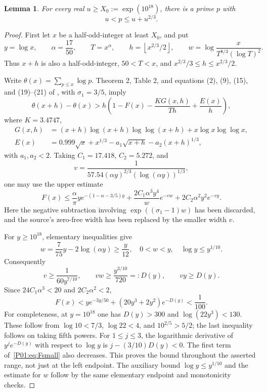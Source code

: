\documentclass[11pt,a4paper]{article}
\newtheorem{lemma}[theorem]{Lemma}\newtheorem{proposition}[theorem]{Proposition}
\theoremstyle{definition}\newtheorem{definition}[theorem]{Definition}
\theoremstyle{remark}\newtheorem{remark}[theorem]{Remark}
\newcommand{\floor}[1]{\left\lfloor#1\right\rfloor}
\begin{document}
\begin{lemma}\label{P01:lem:gap}
For every real $u\geq X_0:=\exp(10^{18})$, there is a prime $p$ with
\[
                  u<p\leq u+u^{2/3}.
\]
\end{lemma}
\begin{proof}
First let $x$ be a half-odd-integer at least $X_0$, and put
\[
 y=\log x,\qquad \alpha=\frac{17}{50},\qquad
 T=x^\alpha,\qquad h=\floor{x^{2/3}/2},\qquad
 w=\log\frac{x}{T^{8/3}(\log T)^2}.
\]
Thus $x+h$ is also a half-odd-integer, $50<T<x$, and
$x^{2/3}/3\leq h\leq x^{2/3}/2$.

Write $\theta(x)=\sum_{p\leq x}\log p$.
Theorem 2, Table 2, and equations (2), (9), (15), and (19)--(21) of
\cite{CH}, with $\sigma_1=3/5$, imply
\begin{equation}\label{P01:eq:theta}
 \theta(x+h)-\theta(x)
 >h\left(1-F(x)-\frac{K G(x,h)}{Th}+\frac{E(x)}h\right),
\end{equation}
where $K=3.4747$,
\begin{align*}
 G(x,h)&=(x+h)\log(x+h)\log\log(x+h)+x\log x\log\log x,\\
 E(x)&=0.999\sqrt{x}+x^{1/3}
                   -a_1\sqrt{x+h}-a_2(x+h)^{1/3},
\end{align*}
with $a_1,a_2<2$. Taking
$C_1=17.418$, $C_2=5.272$, and
\[
 v=\frac{1}{57.54(\alpha y)^{2/3}(\log(\alpha y))^{1/3}},
\]
one may use the upper estimate
\begin{equation}\label{P01:eq:F}
 F(x)\leq\frac{\alpha}{\pi}y e^{-(1-\alpha-3/5)y}
   +\frac{2C_1\alpha^3y^4}{w}e^{-vw}
   +2C_2\alpha^2y^2e^{-vy}.
\end{equation}
Here the negative subtraction involving
$\exp((\sigma_1-1)w)$ has been discarded, and the source's zero-free
width has been replaced by the smaller width $v$.

For $y\geq10^{18}$, elementary inequalities give
\[
 w=\frac7{75}y-2\log(\alpha y)\geq\frac y{12},
 \quad 0<w<y,\quad \log y\leq y^{1/10}.
\]
Consequently
\[
 v\geq\frac1{60y^{7/10}},\qquad
 vw\geq\frac{y^{3/10}}{720}=:D(y),\qquad vy\geq D(y).
\]
Since $24C_1\alpha^3<20$ and $2C_2\alpha^2<2$,
\begin{equation}\label{P01:eq:Fsmall}
 F(x)<y e^{-3y/50}+(20y^3+2y^2)e^{-D(y)}<\frac1{100}.
\end{equation}
For completeness, at $y=10^{18}$ one has
$D(y)>300$ and $\log(22y^3)<130$.
These follow from $\log10<7/3$, $\log22<4$, and
$10^{2/5}>5/2$; the last inequality follows on taking fifth powers.
For $1\leq j\leq3$, the logarithmic derivative of
$y^j e^{-D(y)}$ with respect to $\log y$ is
$j-(3/10)D(y)<0$. The first term of~\eqref{P01:eq:Fsmall} also decreases.
This proves the bound throughout the asserted range, not just at the
left endpoint. The auxiliary bound $\log y\leq y^{1/10}$ and the
estimate for $w$ follow by the same elementary endpoint and monotonicity
checks.


\end{proof}
\end{document}
